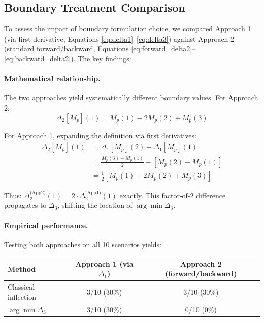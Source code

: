 \documentclass[11pt,a4paper]{article}
\begin{document}
\subsection{Boundary Treatment Comparison}
\label{sec:boundary_comparison}

To assess the impact of boundary formulation choice, we compared Approach 1 (via first derivative, Equations \ref{eq:delta1}--\ref{eq:delta3}) against Approach 2 (standard forward/backward, Equations \ref{eq:forward_delta2}--\ref{eq:backward_delta2}). The key findings:

\paragraph{Mathematical relationship.}
The two approaches yield systematically different boundary values. For Approach 2:
\begin{equation}
\Delta_2[M_p](1) = M_p(1) - 2M_p(2) + M_p(3)
\end{equation}

For Approach 1, expanding the definition via first derivatives:
\begin{align*}
\Delta_2[M_p](1) &= \Delta_1[M_p](2) - \Delta_1[M_p](1) \\
&= \frac{M_p(3) - M_p(1)}{2} - [M_p(2) - M_p(1)] \\
&= \frac{1}{2}[M_p(1) - 2M_p(2) + M_p(3)]
\end{align*}

Thus: $\Delta_2^{\text{(App2)}}(1) = 2 \cdot \Delta_2^{\text{(App1)}}(1)$ exactly. This factor-of-2 difference propagates to $\Delta_3$, shifting the location of $\arg\min \Delta_3$.

\paragraph{Empirical performance.}
Testing both approaches on all 10 scenarios yields:

\begin{table}[h]
\centering
\small
\begin{tabular}{@{}lcc@{}}
\toprule
Method & Approach 1 (via $\Delta_1$) & Approach 2 (forward/backward) \\
\midrule
Classical inflection & 3/10 (30\%) & 3/10 (30\%) \\
$\arg\min \Delta_3$ & 3/10 (30\%) & 0/10 (0\%) \\
\bottomrule
\end{tabular}
\end{table}
\end{document}

